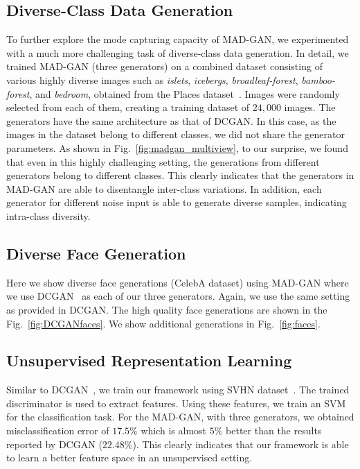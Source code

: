 \subsection{Diverse-Class Data Generation}
To further explore the mode capturing capacity of MAD-GAN, we experimented with a much more challenging task of diverse-class data generation. In detail, we trained MAD-GAN (three generators) on a combined dataset consisting of various highly diverse images such as {\em islets}, {\em icebergs}, {\em broadleaf-forest}, {\em bamboo-forest}, and {\em bedroom}, obtained from the Places dataset~\cite{zhou2017places}. Images were randomly selected from each of them, creating a training dataset of $24,000$ images. The generators have the same architecture as that of DCGAN. In this case, as the images in the dataset belong to different classes, we did not share the generator parameters. As shown in Fig.~\ref{fig:madgan_multiview}, to our surprise, we found that even in this highly challenging setting, the generations from different generators belong to different classes. This clearly indicates that the generators in MAD-GAN are able to disentangle inter-class variations. In addition, each generator for different noise input is able to generate diverse samples, indicating intra-class diversity. 

\subsection{Diverse Face Generation}
Here we show diverse face generations (CelebA dataset) using MAD-GAN where we use DCGAN~\cite{radford2015unsupervised} as each of our three generators. Again, we use the same setting as provided in DCGAN. The high quality face generations are shown in the Fig.~\ref{fig:DCGANfaces}. We show additional generations in Fig.~\ref{fig:faces}.

\subsection{Unsupervised Representation Learning}
\label{subsec:unsup_svhn}
Similar to DCGAN~\cite{radford2015unsupervised}, we train our framework using SVHN dataset~\cite{Netzer11SVHN}. The trained discriminator is used to extract features. Using these features, we train an SVM for the classification task. For the MAD-GAN, with three generators, we obtained misclassification  error of $17.5 \%$ which is almost $5\%$ better than the results reported by DCGAN ($22.48 \%$). This clearly indicates that our framework is able to learn a better feature space in an unsupervised setting. 

